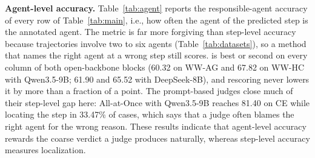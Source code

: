 \textbf{Agent-level accuracy.}
Table~\ref{tab:agent} reports the responsible-agent accuracy of every row of
Table~\ref{tab:main}, i.e., how often the agent of the predicted step is the
annotated agent. The metric is far more forgiving than step-level accuracy because
trajectories involve two to six agents (Table~\ref{tab:datasets}), so a method that
names the right agent at a wrong step still scores. \soap{} is best or second on
every column of both open-backbone blocks (60.32 on WW-AG and 67.82 on WW-HC with
Qwen3.5-9B; 61.90 and 65.52 with DeepSeek-8B), and rescoring never lowers it by more
than a fraction of a point. The prompt-based judges close much of their step-level
gap here: All-at-Once with Qwen3.5-9B reaches 81.40 on CE while locating the step
in 33.47\% of cases, which says that a judge often blames the right agent for the
wrong reason. These results indicate that agent-level accuracy rewards the coarse
verdict a judge produces naturally, whereas step-level accuracy measures
localization.

